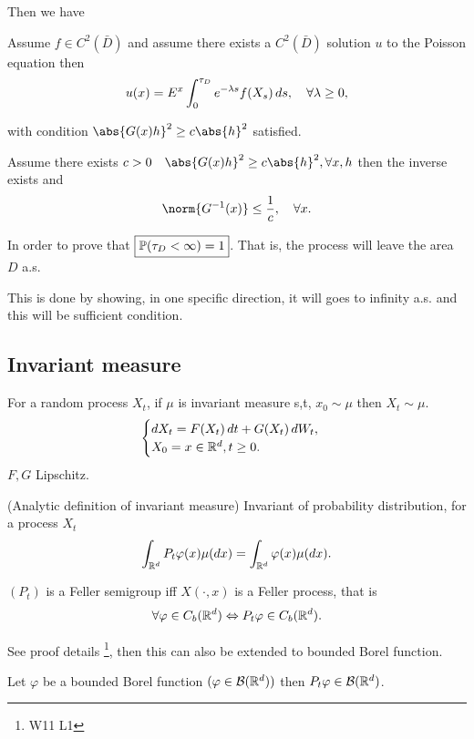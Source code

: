 Then we have 
\begin{thm}
Assume $f\in C^2(\bar{D})$ and assume there exists a $C^2(\bar{D})$ solution $u$ to the Poisson equation then
\begin{equation*}
    u(x) = E^x \int_0^{\tau_D} e^{-\lambda s} f(X_s) \mathop{}\!d s, \quad \forall \lambda \geq 0,
\end{equation*} 
\end{thm}
with condition $\abs{G(x) h}^2 \geq c\abs{h}^2$ satisfied.

\begin{lem}
Assume there exists $c >0 \quad \abs{G(x) h}^2 \geq c\abs{h}^2, \forall x,h$ then the inverse exists and 
\begin{equation*}
    \norm{G^{-1}(x)} \leq \frac{1}{c}, \quad \forall x.
\end{equation*}
\end{lem}

In order to prove that $\boxed{\mathbb{P}(\tau_D < \infty) = 1}$. That is, the process will leave the area $D$ a.s.

This is done by showing, in one specific direction, it will goes to infinity a.s. and this will be sufficient condition.

\subsection{Invariant measure}
For a random process $X_t$, if $\mu$ is invariant measure s,t, $x_0 \sim \mu$ then $X_t \sim \mu$.
\begin{equation*}
\begin{cases}
    \mathop{}\!d X_t = F(X_t) \mathop{}\!d t + G(X_t) \mathop{}\!d W_t, \\
    X_0 = x \in \mathbb{R}^d, t\geq 0.
\end{cases}
\end{equation*} $F, G$ Lipschitz.

\begin{dfn}{(Analytic definition of invariant measure)}
Invariant of probability distribution, for a process $X_t$
\begin{equation*}
    \int_{\mathbb{R}^d} P_t \varphi(x) \mu(\mathop{}\!d x) = \int_{\mathbb{R}^d} \varphi(x) \mu(\mathop{}\!d x).
\end{equation*}
\end{dfn}

\begin{thm} $(P_t)$ is a Feller semigroup iff $X(\cdot, x)$ is a Feller process, that is
\begin{equation*}
    \forall \varphi \in C_b(\mathbb{R}^d) \Leftrightarrow P_t\varphi \in C_b(\mathbb{R}^d).
\end{equation*}
\end{thm}
\pf See proof details \footnote{W11 L1}, then this can also be extended to bounded Borel function.
\begin{cor}
Let $\varphi$ be a bounded Borel function $(\varphi \in \mathcal{B}(\mathbb{R}^d))$ then $P_t\varphi \in \mathcal{B}(\mathbb{R}^d)$.
\end{cor}

